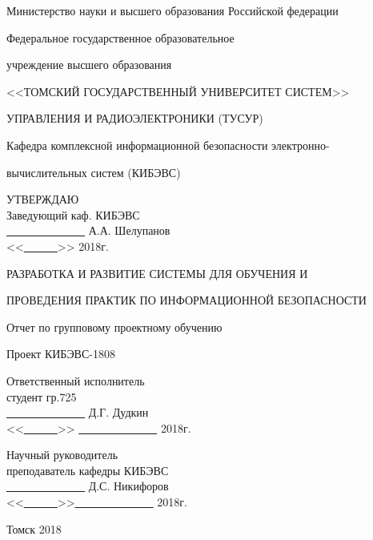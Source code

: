 \documentclass[oneside,final,14pt]{extreport}
\begin{document}
\centerline{Министерство науки и высшего образования Российской федерации}
\centerline{Федеральное государственное образовательное}
\centerline{учреждение высшего образования}
\centerline{<<ТОМСКИЙ ГОСУДАРСТВЕННЫЙ УНИВЕРСИТЕТ СИСТЕМ>>}
\centerline{УПРАВЛЕНИЯ И РАДИОЭЛЕКТРОНИКИ (ТУСУР)}
\centerline{Кафедра комплексной информационной безопасности электронно-}
\centerline{вычислительных систем (КИБЭВС)}
\vfill
\begin {flushright}
УТВЕРЖДАЮ\\
Заведующий каф. КИБЭВС\\
\underline{\ \ \ \ \ \ \ \ \ \ \ \ \ \ } А.А. Шелупанов\\
<<\underline{\ \ \ \ \ \ }>> 2018г.
\end{flushright}
\vfill
\centerline{РАЗРАБОТКА И РАЗВИТИЕ СИСТЕМЫ ДЛЯ ОБУЧЕНИЯ И}
\centerline{ПРОВЕДЕНИЯ ПРАКТИК ПО ИНФОРМАЦИОННОЙ БЕЗОПАСНОСТИ}
\vfill
\centerline{Отчет по групповому проектному обучению}
\vfill
\centerline{Проект КИБЭВС-1808}
\vfill
\begin {flushright}
Ответственный исполнитель\\
студент гр.725\\
\underline{\ \ \ \ \ \ \ \ \ \ \ \ \ \ } Д.Г. Дудкин\\
<<\underline{\ \ \ \ \ \ }>> \underline{\ \ \ \ \ \ \ \ \ \ \ \ \ \ } 2018г.
\end{flushright}
\vfill
\begin {flushright}
Научный руководитель\\
преподаватель кафедры КИБЭВС\\
\underline{\ \ \ \ \ \ \ \ \ \ \ \ \ \ } Д.С. Никифоров\\
<<\underline{\ \ \ \ \ \ }>>\underline{\ \ \ \ \ \ \ \ \ \ \ \ \ \ } 2018г.
\end{flushright}
\vfill
\centerline{Томск 2018}
\end{document}
